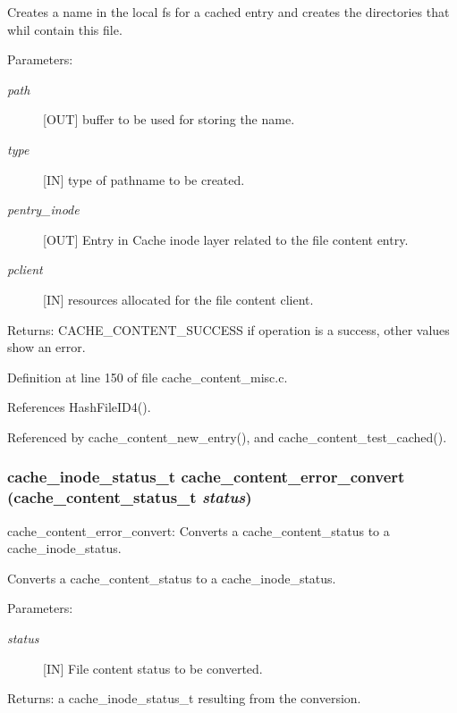 Creates a name in the local fs for a cached entry and creates the directories that whil contain this file.

\begin{Desc}
\item[Parameters:]
\begin{description}
\item[{\em path}][OUT] buffer to be used for storing the name. \item[{\em type}][IN] type of pathname to be created. \item[{\em pentry\_\-inode}][OUT] Entry in Cache inode layer related to the file content entry. \item[{\em pclient}][IN] resources allocated for the file content client.\end{description}
\end{Desc}
\begin{Desc}
\item[Returns:]CACHE\_\-CONTENT\_\-SUCCESS if operation is a success, other values show an error. \end{Desc}


Definition at line 150 of file cache\_\-content\_\-misc.c.

References Hash\-File\-ID4().

Referenced by cache\_\-content\_\-new\_\-entry(), and cache\_\-content\_\-test\_\-cached().
\subsubsection{\setlength{\rightskip}{0pt plus 5cm}cache\_\-inode\_\-status\_\-t cache\_\-content\_\-error\_\-convert (cache\_\-content\_\-status\_\-t {\em status})}\label{cache__content__misc_8c_a10}


cache\_\-content\_\-error\_\-convert: Converts a cache\_\-content\_\-status to a cache\_\-inode\_\-status.

Converts a cache\_\-content\_\-status to a cache\_\-inode\_\-status.

\begin{Desc}
\item[Parameters:]
\begin{description}
\item[{\em status}][IN] File content status to be converted.\end{description}
\end{Desc}
\begin{Desc}
\item[Returns:]a cache\_\-inode\_\-status\_\-t resulting from the conversion. \end{Desc}



